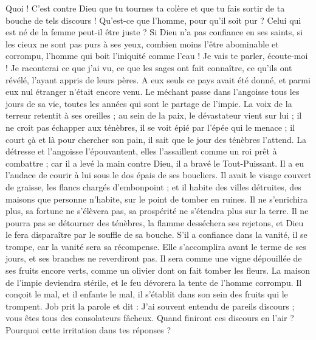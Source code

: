 \begin{multicols}{2}
Quoi ! C'est contre Dieu que tu tournes ta colère et que tu fais sortir de ta bouche de tels discours !
Qu'est-ce que l'homme, pour qu'il soit pur ? Celui qui est né de la femme peut-il être juste ?
Si Dieu n'a pas confiance en ses saints, si les cieux ne sont pas purs à ses yeux,
combien moins l'être abominable et corrompu, l'homme qui boit l'iniquité comme l'eau !
Je vais te parler, écoute-moi ! Je raconterai ce que j'ai vu,
ce que les sages ont fait connaître, ce qu'ils ont révélé, l'ayant appris de leurs pères.
A eux seuls ce pays avait été donné, et parmi eux nul étranger n'était encore venu.
Le méchant passe dans l'angoisse tous les jours de sa vie, toutes les années qui sont le partage de l'impie.
La voix de la terreur retentit à ses oreilles ; au sein de la paix, le dévastateur vient sur lui ;
il ne croit pas échapper aux ténèbres, il se voit épié par l'épée qui le menace ;
il court çà et là pour chercher son pain, il sait que le jour des ténèbres l'attend.
La détresse et l'angoisse l'épouvantent, elles l'assaillent comme un roi prêt à combattre ;
car il a levé la main contre Dieu, il a bravé le Tout-Puissant.
Il a eu l'audace de courir à lui sous le dos épais de ses boucliers.
Il avait le visage couvert de graisse, les flancs chargés d'embonpoint ;
et il habite des villes détruites, des maisons que personne n'habite, sur le point de tomber en ruines.
Il ne s'enrichira plus, sa fortune ne s'élèvera pas, sa prospérité ne s'étendra plus sur la terre.
Il ne pourra pas se détourner des ténèbres, la flamme desséchera ses rejetons, et Dieu le fera disparaître par le souffle de sa bouche.
S'il a confiance dans la vanité, il se trompe, car la vanité sera sa récompense.
Elle s'accomplira avant le terme de ses jours, et ses branches ne reverdiront pas.
Il sera comme une vigne dépouillée de ses fruits encore verts, comme un olivier dont on fait tomber les fleurs.
La maison de l'impie deviendra stérile, et le feu dévorera la tente de l'homme corrompu.
Il conçoit le mal, et il enfante le mal, il s'établit dans son sein des fruits qui le trompent.
\VerseOne{}Job prit la parole et dit :
J'ai souvent entendu de pareils discours ; vous êtes tous des consolateurs fâcheux.
Quand finiront ces discours en l'air ? Pourquoi cette irritation dans tes réponses ?

\end{multicols}
